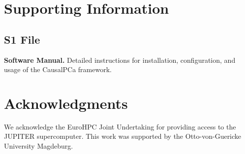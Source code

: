 \documentclass[10pt,letterpaper]{article}
\begin{document}
\section*{Supporting Information}

\subsection*{S1 File}
\label{S1_File}
{\bf Software Manual.} Detailed instructions for installation, configuration, and usage of the CausalPCa framework.

\section*{Acknowledgments}
We acknowledge the EuroHPC Joint Undertaking for providing access to the JUPITER supercomputer. This work was supported by the Otto-von-Guericke University Magdeburg.

\nolinenumbers

% 
\end{document}
